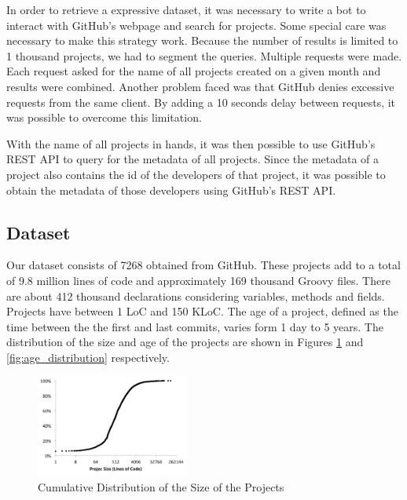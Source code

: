 \documentclass[preprint]{sigplanconf}
\begin{document}
In order to retrieve a expressive dataset, it was necessary to write a bot to interact with GitHub's webpage and search for projects. 
Some special care was necessary to make this strategy work. 
Because the number of results is limited to 1 thousand projects, we had to segment the queries.
Multiple requests were made.
Each request asked for the name of all projects created on a given month and results were combined.
Another problem faced was that GitHub denies excessive requests from the same client.
By adding a 10 seconds delay between requests, it was possible to overcome this limitation.

With the name of all projects in hands, it was then possible to use GitHub's REST API to query for the metadata of all projects.
Since the metadata of a project also contains the id of the developers of that project, it was possible to obtain the metadata of those developers using GitHub's REST API.

\subsection{Dataset\label{dataset}}


Our dataset consists of 7268 obtained from GitHub. 
These projects add to a total of 9.8 million lines of code and approximately 169 thousand Groovy files. 
There are about 412 thousand declarations considering variables, methods and fields. Projects have between 1 LoC and 150 KLoC. The age of a project, defined as the time between the the first and last commits, varies form 1 day to 5 years. The distribution of the size and age of the projects are shown in Figures \ref{fig:size_distribution} and \ref{fig:age_distribution} respectively. 

\begin{figure}[ht]
\centering \includegraphics[width=0.45\textwidth]{images/size_distribution}
\caption{Cumulative Distribution of the Size of the Projects}
\label{fig:size_distribution} 
\end{figure}
\end{document}

